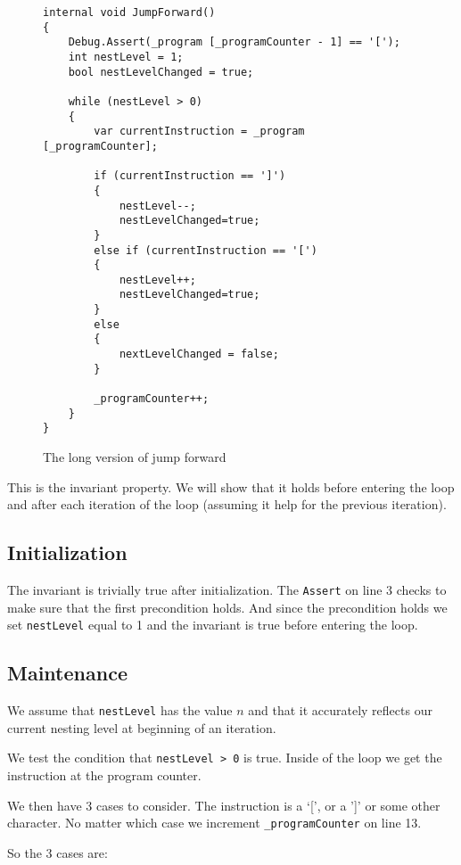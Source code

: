 \documentclass[10pt]{article}
\begin{document}
\begin{figure}
\caption{The long version of jump forward}
\label{fig:jumpforwardlong}
\begin{lstlisting}
internal void JumpForward()
{
    Debug.Assert(_program [_programCounter - 1] == '[');
    int nestLevel = 1;
    bool nestLevelChanged = true;

    while (nestLevel > 0)
    {
        var currentInstruction = _program [_programCounter];
        
        if (currentInstruction == ']') 
        {
            nestLevel--; 
            nestLevelChanged=true;
        }
        else if (currentInstruction == '[') 
        {
            nestLevel++;
            nestLevelChanged=true;
        }
        else
        {
            nextLevelChanged = false;
        }
        
        _programCounter++;
    }
}
\end{lstlisting}
\end{figure}

This is the invariant property. We will show that it holds before
entering the loop and after each iteration of the loop (assuming
it help for the previous iteration).

\subsection*{Initialization}
The invariant is trivially true after initialization. The 
\verb!Assert! on line 3 checks to make sure that the first precondition holds.
And since the precondition holds we set \verb!nestLevel! equal to 1 and the 
invariant is true before entering the loop.

\subsection*{Maintenance}
We assume that \verb!nestLevel! has the value $n$ and that it accurately
reflects our current nesting level at beginning of an iteration.

We test the condition that \verb!nestLevel > 0! is true. Inside of the loop
we get the instruction at the program counter.

We then have 3 cases to consider. The instruction is a `[', or a ']' or some
other character. No matter which case we increment \verb!_programCounter!
on line 13.

So the 3 cases are:
\end{document}
